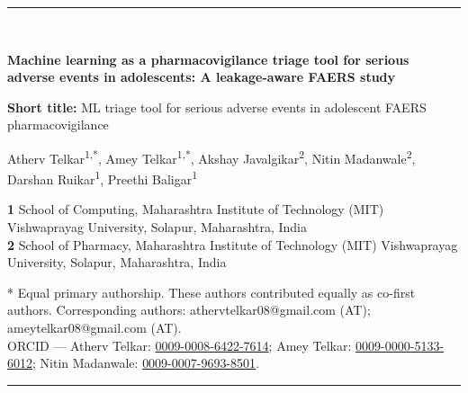 \documentclass[10pt]{article}
\title{}
\author{}
\date{}
\begin{document}
\linenumbers          %
\thispagestyle{plain}

{\parindent0pt
   \noindent
   {\rule{\linewidth}{2.2pt}}\\[10pt]

   {\raggedright\sffamily\bfseries\fontsize{20}{24}\selectfont
   Machine learning as a pharmacovigilance triage tool for serious adverse events in adolescents: A leakage-aware FAERS study\par}
   \vspace{6pt}

   {\raggedright\sffamily\small\textbf{Short title:} ML triage tool for serious adverse events in adolescent FAERS pharmacovigilance\par}
   \vspace{10pt}

   {\raggedright\large
   Atherv Telkar\textsuperscript{1,*},
   Amey Telkar\textsuperscript{1,*},
   Akshay Javalgikar\textsuperscript{2},
   Nitin Madanwale\textsuperscript{2},
   Darshan Ruikar\textsuperscript{1},
   Preethi Baligar\textsuperscript{1}\par}
   \vspace{6pt}

   {\raggedright\small
   \textbf{1} School of Computing, Maharashtra Institute of Technology
   (MIT) Vishwaprayag University, Solapur, Maharashtra, India\\
   \textbf{2} School of Pharmacy, Maharashtra Institute of Technology
   (MIT) Vishwaprayag University, Solapur, Maharashtra, India\par}
   \vspace{4pt}
   {\raggedright\footnotesize
   * Equal primary authorship. These authors contributed equally as
   co-first authors. Corresponding authors:
   athervtelkar08@gmail.com (AT); ameytelkar08@gmail.com (AT).\\
   ORCID --- Atherv Telkar: \href{https://orcid.org/0009-0008-6422-7614}{0009-0008-6422-7614};
   Amey Telkar: \href{https://orcid.org/0009-0000-5133-6012}{0009-0000-5133-6012};
   Nitin Madanwale: \href{https://orcid.org/0009-0007-9693-8501}{0009-0007-9693-8501}.\par}
   \vspace{10pt}
   {\rule{\linewidth}{0.8pt}}\\[10pt]

}
\end{document}
